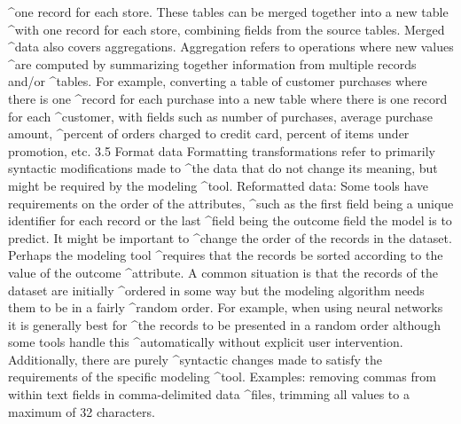 \begin{AppCPrompt}
\AppCCont@^one record for each store. These tables can be merged together into a new table
\AppCCont@^with one record for each store, combining fields from the source tables. Merged
\AppCCont@^data also covers aggregations. Aggregation refers to operations where new values
\AppCCont@^are computed by summarizing together information from multiple records and/or
\AppCCont@^tables. For example, converting a table of customer purchases where there is one
\AppCCont@^record for each purchase into a new table where there is one record for each
\AppCCont@^customer, with fields such as number of purchases, average purchase amount,
\AppCCont@^percent of orders charged to credit card, percent of items under promotion, etc.
3.5 Format data
Formatting transformations refer to primarily syntactic modifications made to
\AppCCont@^the data that do not change its meaning, but might be required by the modeling
\AppCCont@^tool.
Reformatted data: Some tools have requirements on the order of the attributes,
\AppCCont@^such as the first field being a unique identifier for each record or the last
\AppCCont@^field being the outcome field the model is to predict. It might be important to
\AppCCont@^change the order of the records in the dataset. Perhaps the modeling tool
\AppCCont@^requires that the records be sorted according to the value of the outcome
\AppCCont@^attribute. A common situation is that the records of the dataset are initially
\AppCCont@^ordered in some way but the modeling algorithm needs them to be in a fairly
\AppCCont@^random order. For example, when using neural networks it is generally best for
\AppCCont@^the records to be presented in a random order although some tools handle this
\AppCCont@^automatically without explicit user intervention. Additionally, there are purely
\AppCCont@^syntactic changes made to satisfy the requirements of the specific modeling
\AppCCont@^tool. Examples: removing commas from within text fields in comma-delimited data
\AppCCont@^files, trimming all values to a maximum of 32 characters.
\end{AppCPrompt}
